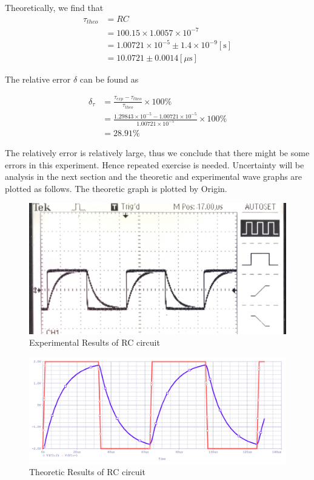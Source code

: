 \documentclass[a4paper]{article}
\begin{document}
Theoretically, we find that
\begin{align*}
	\tau_{theo}
	 & =RC                                                   \\
	 & =100.15\times 1.0057\times 10^{-7}                    \\
	 & =1.00721\times 10^{-5}\pm 1.4\times 10^{-9}[\text{s}] \\
	 & =10.0721\pm 0.0014[\mu \text{s}]
\end{align*}

The relative error $\delta$ can be found as

\begin{align*}
	\delta_{\tau}
	 & = \frac{\tau_{exp}-\tau_{theo}}{\tau_{theo}}\times 100\%                                \\
	 & = \frac{1.29843\times 10^{-5}-1.00721\times 10^{-5}}{1.00721\times 10^{-5}}\times 100\% \\
	 & = 28.91\%
\end{align*}

The relatively error is relatively large, thus we conclude that there might be some errors in this experiment. Hence repeated exercise is needed.
Uncertainty will be analysis in the next section and the theoretic and experimental wave graphs are plotted as follows. The theoretic graph is plotted by Origin.

\newpage
\begin{figure}[!htbp]
	\center
	\includegraphics[width=12cm]{rc_exp.jpg}
	\caption{Experimental Results of RC circuit}
\end{figure}

\begin{figure}[!htbp]
	\center
	\includegraphics[width=12cm]{rc_theo.png}
	\caption{Theoretic Results of RC circuit}
\end{figure}
\end{document}
